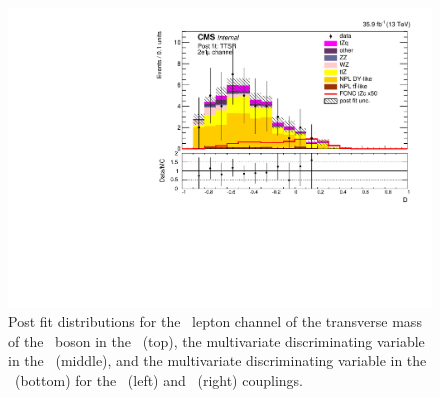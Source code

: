 \begin{figure}[htbp]
	\includegraphics[width=0.49\linewidth]{6_Search/Figures/ZctFit/New/shapes_fit_s_LepChan_2e1mu_TTSR_error_trial.pdf}
	\caption{Post fit distributions for the \eemu\ lepton channel of the transverse mass of the \PW\ boson in the \WZCR\ (top), the multivariate discriminating variable in the \STSR\ (middle), and the multivariate discriminating variable in the \TTSR\ (bottom) for the \Zut\ (left) and \Zct\ (right) couplings. }
	\label{fig:shapesfit2e1mu}
\end{figure}

